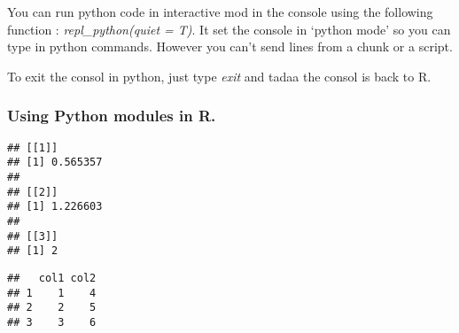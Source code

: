 \documentclass[
]{article}
\newenvironment{Shaded}{\begin{snugshade}}{\end{snugshade}}
\newcommand{\AttributeTok}[1]{\textcolor[rgb]{0.77,0.63,0.00}{#1}}
\newcommand{\CommentTok}[1]{\textcolor[rgb]{0.56,0.35,0.01}{\textit{#1}}}
\newcommand{\DecValTok}[1]{\textcolor[rgb]{0.00,0.00,0.81}{#1}}
\newcommand{\FloatTok}[1]{\textcolor[rgb]{0.00,0.00,0.81}{#1}}
\newcommand{\FunctionTok}[1]{\textcolor[rgb]{0.00,0.00,0.00}{#1}}
\newcommand{\NormalTok}[1]{#1}
\newcommand{\OtherTok}[1]{\textcolor[rgb]{0.56,0.35,0.01}{#1}}
\newcommand{\SpecialCharTok}[1]{\textcolor[rgb]{0.00,0.00,0.00}{#1}}
\newcommand{\StringTok}[1]{\textcolor[rgb]{0.31,0.60,0.02}{#1}}
\begin{document}
You can run python code in interactive mod in the console using the
following function : \emph{repl\_python(quiet = T)}. It set the console
in `python mode' so you can type in python commands. However you can't
send lines from a chunk or a script.

To exit the consol in python, just type \emph{exit} and tadaa the consol
is back to R.

\hypertarget{using-python-modules-in-r.}{%
\subsubsection{Using Python modules in
R.}\label{using-python-modules-in-r.}}

\begin{Shaded}
\end{Shaded}

\begin{verbatim}
## [[1]]
## [1] 0.565357
## 
## [[2]]
## [1] 1.226603
## 
## [[3]]
## [1] 2
\end{verbatim}

\begin{Shaded}
\end{Shaded}

\begin{verbatim}
##   col1 col2
## 1    1    4
## 2    2    5
## 3    3    6
\end{verbatim}
\end{document}
